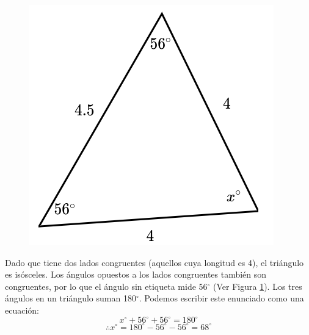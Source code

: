 \begin{minipage}[t][][t]{0.6\textwidth}
    \begin{solutionbox}{8cm}
        \begin{minipage}{0.3\textwidth}
            \begin{figure}[H]
                \centering
                \includegraphics[width=0.9\linewidth]{../images/findangle06a.png}
                \caption{}
                \label{fig:findangle06a}
            \end{figure}
        \end{minipage}\hfill
        \begin{minipage}{0.65\textwidth}
            Dado que tiene dos lados congruentes (aquellos cuya longitud es 4), el triángulo es isósceles. Los ángulos opuestos a los lados congruentes también son congruentes, por lo que el ángulo sin etiqueta mide 56$^\circ$ (Ver Figura \ref{fig:findangle06a}).
            Los tres ángulos en un triángulo suman 180$^\circ$. Podemos escribir este enunciado como una ecuación:
            \[x^\circ + 56^\circ + 56^\circ = 180^\circ \]
            \[\therefore x^\circ = 180^\circ - 56^\circ - 56^\circ  = 68^\circ\]
        \end{minipage}
    \end{solutionbox}
\end{minipage}
